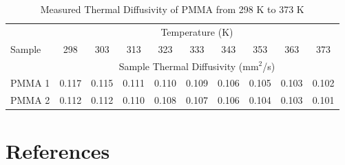 \documentclass{book}
\begin{document}
\begin{table}[ht]
\caption{Measured Thermal Diffusivity of PMMA from 298 K to 373 K}
\label{Table_15}
\begin{center}
\begin{tabular}{|l|ccccccccc|}
\hline
        & \multicolumn{9}{|c|}{Temperature (K)}                                 \\ \cline{2-10}
Sample  & 298  & 303  & 313  & 323  & 333  & 343  & 353  & 363  & 373           \\ \cline{2-10}
        & \multicolumn{9}{|c|}{Sample Thermal Diffusivity (mm$^2$/s)}           \\ \hline
PMMA 1  & 0.117 & 0.115 & 0.111 & 0.110 & 0.109 & 0.106 & 0.105 & 0.103 & 0.102 \\
PMMA 2  & 0.112 & 0.112 & 0.110 & 0.108 & 0.107 & 0.106 & 0.104 & 0.103 & 0.101 \\ \hline
\end{tabular}
\end{center}
\end{table}




\backmatter

\chapter{References}


\end{document}
